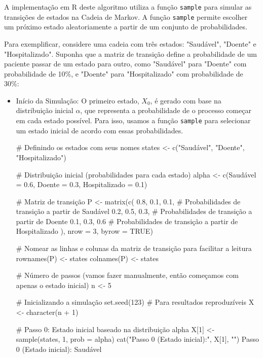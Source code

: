 \documentclass[12pt]{article}
\theoremstyle{break}
\begin{document}
A implementação em R deste algoritmo utiliza a função \texttt{sample} para simular as transições de estados na Cadeia de Markov. A função \texttt{sample} permite escolher um próximo estado aleatoriamente a partir de um conjunto de probabilidades.


Para exemplificar, considere uma cadeia com três estados: "Saudável", "Doente" e "Hospitalizado". Suponha que a matriz de transição define a probabilidade de um paciente passar de um estado para outro, como "Saudável" para "Doente" com probabilidade de 10\%, e "Doente" para "Hospitalizado" com probabilidade de 30\%:


\begin{itemize}
    \item Início da Simulação: O primeiro estado, \( X_0 \), é gerado com base na distribuição inicial \( \alpha \), que representa a probabilidade de o processo começar em cada estado possível. Para isso, usamos a função \texttt{sample} para selecionar um estado inicial de acordo com essas probabilidades.




\begin{RCodeBox}
# Definindo os estados com seus nomes
states <- c("Saudável", "Doente", "Hospitalizado")

# Distribuição inicial (probabilidades para cada estado)
alpha <- c(Saudável = 0.6, Doente = 0.3, Hospitalizado = 0.1)

# Matriz de transição
P <- matrix(c(
  0.8, 0.1, 0.1,   # Probabilidades de transição a partir de Saudável
  0.2, 0.5, 0.3,   # Probabilidades de transição a partir de Doente
  0.1, 0.3, 0.6    # Probabilidades de transição a partir de Hospitalizado
), nrow = 3, byrow = TRUE)

# Nomear as linhas e colunas da matriz de transição para facilitar a leitura
rownames(P) <- states
colnames(P) <- states

# Número de passos (vamos fazer manualmente, então começamos com apenas o estado inicial)
n <- 5

# Inicializando a simulação
set.seed(123)  # Para resultados reproduzíveis
X <- character(n + 1)

# Passo 0: Estado inicial baseado na distribuição alpha
X[1] <- sample(states, 1, prob = alpha)
cat("Passo 0 (Estado inicial):", X[1], "\n")
Passo 0 (Estado inicial): Saudável 
\end{RCodeBox}




\end{itemize}
\end{document}

